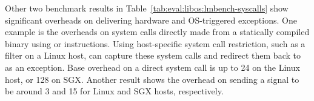 Other two benchmark results in Table~\ref{tab:eval:libos:lmbench-syscalls}
show significant overheads
on delivering hardware and OS-triggered exceptions.
One example
is the overheads on system calls directly made from a statically compiled binary
using  or  instructions.
Using host-specific system call restriction,
such as a \seccomp{} filter
on a Linux host,
\graphene{} can capture these system calls %
and redirect them back to \thelibos{} as an exception. %
Base overhead on a direct system call
is up to 24\x{} on the Linux host, or 128\x{} on SGX.
Another result shows the overhead on
sending a  signal
to be around 3\x{} and 15\x{} for Linux and SGX hosts, respectively.















